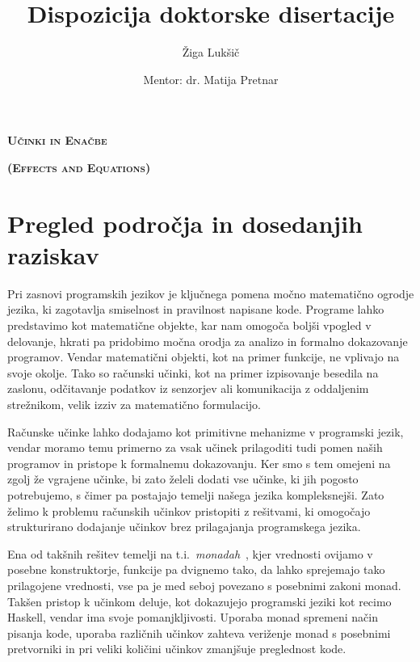 \documentclass{article}
\title{Dispozicija doktorske disertacije}
\author{Žiga Lukšič \and Mentor: dr. Matija Pretnar}
\date{}
\begin{document}
\maketitle

\vspace{-10mm}
\begin{center}
  \Large{\textsc{\textbf{Učinki in Enačbe}}}

  \Large{\textsc{\textbf{(Effects and Equations)}}}
\end{center}

\section*{Pregled področja in dosedanjih raziskav}

Pri zasnovi programskih jezikov je ključnega pomena močno matematično ogro\-dje jezika, ki zagotavlja smiselnost in pravilnost napisane kode. Programe lahko predstavimo kot matematične objekte, kar nam omogoča boljši vpogled v delovanje, hkrati pa pridobimo močna orodja za analizo in formalno dokazovanje programov.
Vendar matematični objekti, kot na primer funkcije, ne vplivajo na svoje okolje. Tako so računski učinki, kot na primer izpisovanje besedila na zaslonu, odčitavanje podatkov iz senzorjev ali komunikacija z oddaljenim strežnikom, velik izziv za matematično formulacijo.

Računske učinke lahko dodajamo kot primitivne mehanizme v programski jezik, vendar moramo temu primerno za vsak učinek prilagoditi tudi pomen naših programov in pristope k formalnemu dokazovanju. Ker smo s tem omejeni na zgolj že vgrajene učinke, bi zato želeli dodati vse učinke, ki jih pogosto potrebujemo, s čimer pa postajajo temelji našega jezika kompleksnejši. Zato želimo k problemu računskih učinkov pristopiti z rešitvami, ki omogočajo strukturirano dodajanje učinkov brez prilagajanja programskega jezika.

Ena od takšnih rešitev temelji na t.i.\ \emph{monadah}~\cite{DBLP:journals/iandc/Moggi91}, kjer vrednosti ovijamo v posebne konstruktorje, funkcije pa dvignemo tako, da lahko sprejemajo tako prilagojene vrednosti, vse pa je med seboj povezano s posebnimi zakoni monad. Takšen pristop k učinkom deluje, kot dokazujejo programski jeziki kot recimo Haskell, vendar ima svoje pomanjkljivosti. Uporaba monad spremeni način pisanja kode, uporaba različnih učinkov zahteva veriženje monad s posebnimi pretvorniki in pri veliki količini učinkov zmanjšuje preglednost kode.
\end{document}
